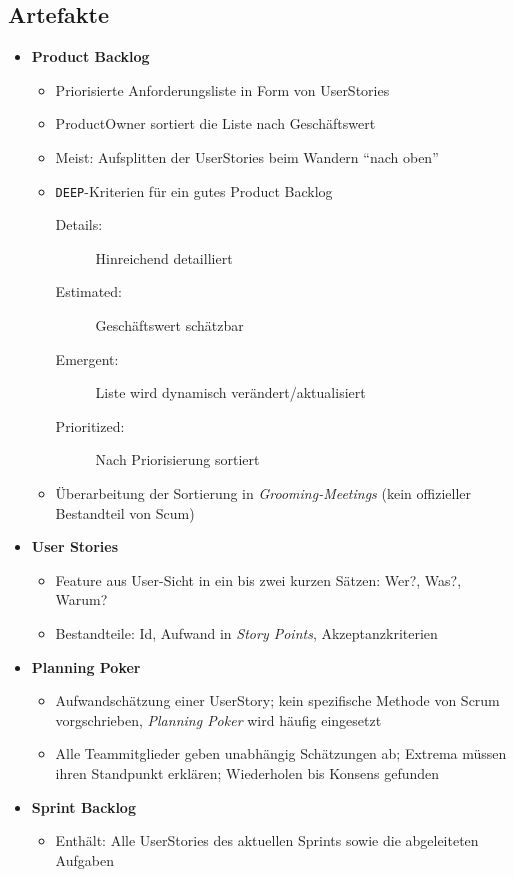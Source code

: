 \subsection{Artefakte}
\begin{itemize}
	\item \textbf{Product Backlog}
	\begin{itemize}
		\item Priorisierte Anforderungsliste in Form von UserStories
		\item ProductOwner sortiert die Liste nach Geschäftswert
		\item Meist: Aufsplitten der UserStories beim Wandern "`nach oben"'
		\item \texttt{DEEP}-Kriterien für ein gutes Product Backlog
		\begin{description}
			\item[Details:] Hinreichend detailliert
			\item[Estimated:] Geschäftswert schätzbar
			\item[Emergent:] Liste wird dynamisch verändert/aktualisiert
			\item[Prioritized:] Nach Priorisierung sortiert
		\end{description}
		\item Überarbeitung der Sortierung in \textit{Grooming-Meetings} (kein offizieller Bestandteil von Scum)
	\end{itemize}
	\item \textbf{User Stories}
	\begin{itemize}
		\item Feature aus User-Sicht in ein bis zwei kurzen Sätzen: Wer?, Was?, Warum?
		\item Bestandteile: Id, Aufwand in \textit{Story Points}, Akzeptanzkriterien
	\end{itemize}
	\item \textbf{Planning Poker}
	\begin{itemize}
		\item Aufwandschätzung einer UserStory; kein spezifische Methode von Scrum vorgschrieben, \textit{Planning Poker} wird häufig eingesetzt
		\item Alle Teammitglieder geben unabhängig Schätzungen ab; Extrema müssen ihren Standpunkt erklären; Wiederholen bis Konsens gefunden
	\end{itemize}
	\item \textbf{Sprint Backlog}
	\begin{itemize}
		\item Enthält: Alle UserStories des aktuellen Sprints sowie die abgeleiteten Aufgaben

\end{itemize}
\end{itemize}
